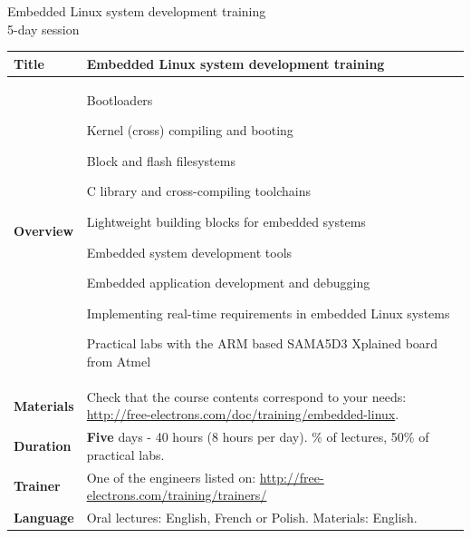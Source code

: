 \documentclass[a4paper,12pt,obeyspaces,spaces,hyphens]{article}
\begin{document}
\thispagestyle{fancy}

\setlength{\arrayrulewidth}{0.8pt}

\begin{center}
\LARGE
Embedded Linux system development training\\
\large
5-day session
\end{center}
\vspace{1cm}

\small
{}

 {
  \begin{tabularx}{\textwidth}{|g|h|}
    {\bf Title} & {\bf Embedded Linux system development training} \\
    \hline

    {\bf Overview} &
	Bootloaders \par
    Kernel (cross) compiling and booting \par
	Block and flash filesystems \par
    C library and cross-compiling toolchains \par
	Lightweight building blocks for embedded systems \par
    Embedded system development tools \par
	Embedded application development and debugging \par
	Implementing real-time requirements in embedded Linux systems \par
	Practical labs with the ARM based SAMA5D3 Xplained board from Atmel \\
    \hline
    {\bf Materials} &
    Check that the course contents correspond to your needs:
    \newline \url{http://free-electrons.com/doc/training/embedded-linux}. \\
    \hline

    {\bf Duration} & {\bf Five} days - 40 hours (8 hours per day).
    \% of lectures, 50\% of practical labs. \\
    \hline

    {\bf Trainer} & One of the engineers listed on:
    \newline \url{http://free-electrons.com/training/trainers/}\\
    \hline

    {\bf Language} & Oral lectures: English, French or Polish.
    \newline Materials: English.\\
    \hline


\end{tabularx}}
\end{document}
